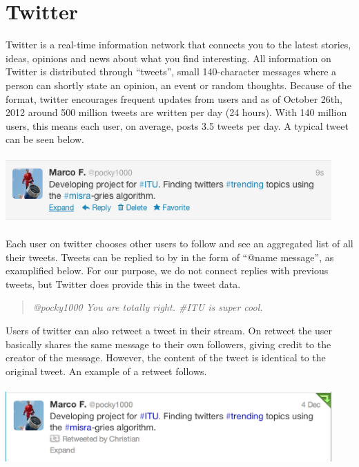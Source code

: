 \section{Twitter}
\label{twitter}
Twitter is a real-time information network that connects you to the latest stories, ideas, opinions and news about what you find interesting. All information on Twitter is distributed through ``tweets'', small 140-character messages where a person can shortly state an opinion, an event or random thoughts. Because of the format, twitter encourages frequent updates from users and as of October 26th, 2012 around 500 million tweets are written per day (24 hours)\cite{Cnet1}. With 140 million users, this means each user, on average, posts 3.5 tweets per day. A typical tweet can be seen below.
\\\\
\includegraphics[width=125mm]{tweet.png}
\\\\
Each user on twitter chooses other users to follow and see an aggregated list of all their tweets. Tweets can be replied to by in the form of ``@name message'', as examplified below. For our purpose, we do not connect replies with previous tweets, but Twitter does provide this in the tweet data.

\begin{quote}
    \emph{@pocky1000 You are totally right. \#ITU is super cool.}
\end{quote}

Users of twitter can also retweet a tweet in their stream. On retweet the user basically shares the same message to their own followers, giving credit to the creator of the message. However, the content of the tweet is identical to the original tweet. An example of a retweet follows.
\\\\
\includegraphics[width=125mm]{retweet.png}
\\\\
